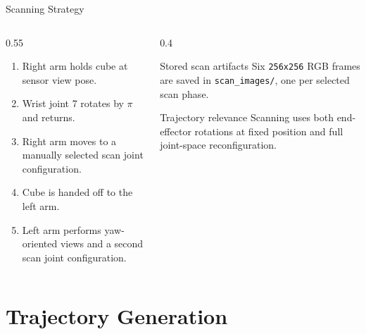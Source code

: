 \documentclass[10pt,aspectratio=169]{beamer}
\begin{document}
\begin{frame}{Scanning Strategy}
  \begin{columns}[T]
    \begin{column}{0.55\textwidth}
      \begin{enumerate}
        \item Right arm holds cube at sensor view pose.
        \item Wrist joint 7 rotates by $\pi$ and returns.
        \item Right arm moves to a manually selected scan joint configuration.
        \item Cube is handed off to the left arm.
        \item Left arm performs yaw-oriented views and a second scan joint configuration.
      \end{enumerate}
    \end{column}
    \begin{column}{0.4\textwidth}
      \begin{block}{Stored scan artifacts}
        Six \texttt{256x256} RGB frames are saved in \texttt{scan\_images/}, one per selected scan phase.
      \end{block}
      \begin{block}{Trajectory relevance}
        Scanning uses both end-effector rotations at fixed position and full joint-space reconfiguration.
      \end{block}
    \end{column}
  \end{columns}
\end{frame}

\section{Trajectory Generation}
\end{document}
